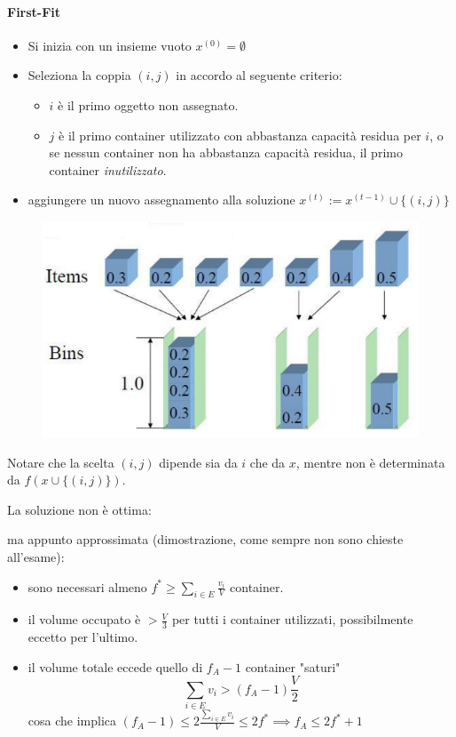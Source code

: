 \documentclass{article}
\begin{document}
\paragraph{First-Fit}
\begin{itemize}
    \item Si inizia con un insieme vuoto $x^{(0)}=\emptyset$
    \item Seleziona la coppia $(i,j)$ in accordo al seguente criterio:
          \begin{itemize}
              \item $i$ è il primo oggetto non assegnato.
              \item $j$ è il primo container utilizzato con abbastanza capacità
                    residua per $i$, o se nessun container non ha abbastanza capacità residua,
                    il primo container \textit{inutilizzato}.
          \end{itemize}
    \item aggiungere un nuovo assegnamento alla soluzione $x^{(t)}:=x^{(t-1)}\cup\{(i,j)\}$
\end{itemize}
\begin{figure}[H]
    \centering
    \includegraphics[scale=0.5]{images/bpp_first-fit.png}
\end{figure}
Notare che la scelta $(i,j)$ dipende sia da $i$ che da $x$, mentre non è
determinata da $f(x\cup\{(i,j)\})$.

La soluzione non è ottima:

ma appunto approssimata (dimostrazione, come sempre non sono
chieste all'esame):
\begin{itemize}
    \item sono necessari almeno $f^*\geq\sum_{i\in E}\frac{v_i}{V}$ container.
    \item il volume occupato è $>\frac{V}{3}$ per tutti i container utilizzati,
          possibilmente eccetto per l'ultimo.
    \item il volume totale eccede quello di $f_A-1$ container "saturi"
          $$\sum_{i\in E}v_i > (f_A-1)\frac{V}{2}$$
          cosa che implica $(f_A-1)\leq 2\frac{\sum_{i\in E}v_i}{V}\leq 2f^*\implies f_A\leq 2f^* +1$
\end{itemize}
\end{document}
